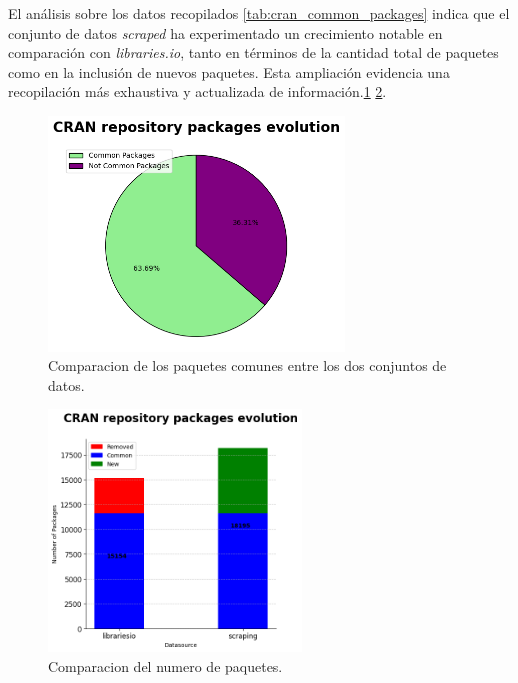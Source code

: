 El análisis sobre los datos recopilados \ref{tab:cran_common_packages} indica que el conjunto de datos \textit{scraped}
ha experimentado un crecimiento notable en comparación con \textit{libraries.io}, tanto en
términos de la cantidad total de paquetes como en la inclusión de nuevos paquetes.
Esta ampliación evidencia una recopilación más exhaustiva y actualizada de información.\ref{fig:cran_common_packages2}
\ref{fig:cran_common_packages3}.

\begin{figure}[h!]
    \begin{center}
        \includegraphics[width=0.7\textwidth]{img/cran/circle.png}
        \caption{Comparacion de los paquetes comunes entre los dos conjuntos de datos.}
        \label{fig:cran_common_packages2}
    \end{center}
\end{figure}

\begin{figure}[h!]
    \begin{center}
        \includegraphics[width=0.6\textwidth]{img/cran/bars.png}
        \caption{Comparacion del numero de paquetes.}
        \label{fig:cran_common_packages3}
    \end{center}
\end{figure}

